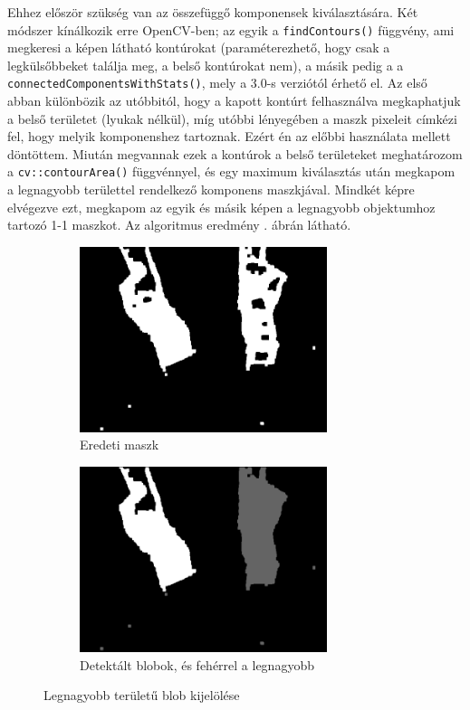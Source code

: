 Ehhez először szükség van az összefüggő komponensek kiválasztására. Két módszer kínálkozik erre OpenCV-ben; az egyik a \texttt{findContours()} függvény, ami megkeresi a képen látható kontúrokat (paraméterezhető, hogy csak a legkülsőbbeket találja meg, a belső kontúrokat nem), a másik pedig a a \texttt{connectedComponentsWithStats()}, mely a 3.0-s verziótól érhető el. Az első abban különbözik az utóbbitól, hogy a kapott kontúrt felhasználva megkaphatjuk a belső területet (lyukak nélkül), míg utóbbi lényegében a maszk pixeleit címkézi fel, hogy melyik komponenshez tartoznak. Ezért én az előbbi használata mellett döntöttem. Miután megvannak ezek a kontúrok a belső területeket meghatározom a \texttt{cv::contourArea()} függvénnyel, és egy maximum kiválasztás után megkapom a legnagyobb területtel rendelkező komponens maszkjával. Mindkét képre elvégezve ezt, megkapom az egyik és másik képen a legnagyobb objektumhoz tartozó 1-1 maszkot. Az algoritmus eredmény . ábrán látható.

\begin{figure}[tbh]
\centering
\begin{subfigure}[b]{.49\linewidth}
	\centering
	\includegraphics[width=205pt]{figures/mask_ofmask_104.png}
	\caption{Eredeti maszk}
  \end{subfigure}
\begin{subfigure}[b]{.49\linewidth}
	\centering
	\includegraphics[width=205pt]{figures/mask_ofmask_104_selected.png}
	\caption{Detektált blobok, és fehérrel a legnagyobb}
  \end{subfigure}
\caption{Legnagyobb területű blob kijelölése \label{fig:single-obj}}
\end{figure}

